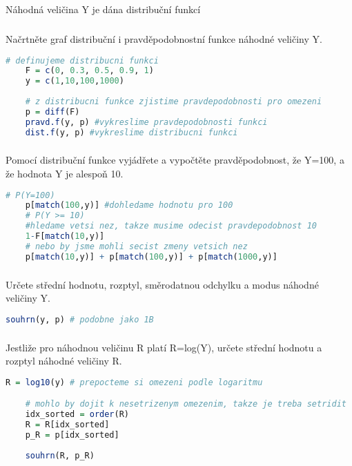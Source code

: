 \documentclass{article}%
\begin{document}
\newpage
\subsection{}
Náhodná veličina Y je dána distribuční funkcí

\subsubsection{}
Načrtněte graf distribuční i pravděpodobnostní funkce náhodné veličiny Y. 
\begin{lstlisting}[language=R, showstringspaces=false, basicstyle=\small]
    # definujeme distribucni funkci
    F = c(0, 0.3, 0.5, 0.9, 1)
    y = c(1,10,100,1000)
    
    # z distribucni funkce zjistime pravdepodobnosti pro omezeni
    p = diff(F)
    pravd.f(y, p) #vykreslime pravdepodobnosti funkci
    dist.f(y, p) #vykreslime distribucni funkci    
\end{lstlisting}

\subsubsection{}
Pomocí distribuční funkce vyjádřete a vypočtěte pravděpodobnost, že Y=100, a že hodnota Y je alespoň 10. 
\begin{lstlisting}[language=R, showstringspaces=false, basicstyle=\small]
    # P(Y=100) 
    p[match(100,y)] #dohledame hodnotu pro 100
    # P(Y >= 10)
    #hledame vetsi nez, takze musime odecist pravdepodobnost 10
    1-F[match(10,y)] 
    # nebo by jsme mohli secist zmeny vetsich nez    
    p[match(10,y)] + p[match(100,y)] + p[match(1000,y)] 
\end{lstlisting}

\subsubsection{}
Určete střední hodnotu, rozptyl, směrodatnou odchylku a modus náhodné veličiny Y. 
\begin{lstlisting}[language=R, showstringspaces=false, basicstyle=\small]
    souhrn(y, p) # podobne jako 1B
\end{lstlisting}

\subsubsection{}
Jestliže pro náhodnou veličinu R platí R=log(Y), určete střední hodnotu a rozptyl náhodné veličiny R. 
\begin{lstlisting}[language=R, showstringspaces=false, basicstyle=\small]
    R = log10(y) # prepocteme si omezeni podle logaritmu

    # mohlo by dojit k nesetrizenym omezenim, takze je treba setridit
    idx_sorted = order(R)
    R = R[idx_sorted]
    p_R = p[idx_sorted]
    
    souhrn(R, p_R)    
\end{lstlisting}
\end{document}
